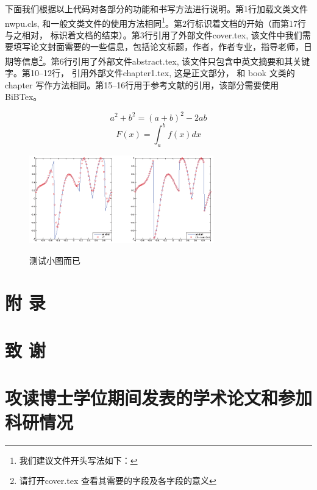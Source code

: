 \documentclass{nwpu}
\begin{document}
                \par
                \vskip 20pt
            下面我们根据以上代码对各部分的功能和书写方法进行说明。第1行加载文类文件nwpu.cls, 和一般文类文件的使用方法相同\footnote{我们建议文件开头写法如下：}。第2行标识着文档的开始（而第17行与之相对， 标识着文档的结束）。第3行引用了外部文件cover.tex, 该文件中我们需要填写论文封面需要的一些信息，包括论文标题，作者，作者专业，指导老师，日期等信息\footnote{请打开cover.tex 查看其需要的字段及各字段的意义}。第6行引用了外部文件abstract.tex, 该文件只包含中英文摘要和其关键字。第10--12行， 引用外部文件chapter1.tex, 这是正文部分， 和 book 文类的 chapter 写作方法相同。第15--16行用于参考文献的引用，该部分需要使用BiBTex\cite{LatexCompanion}。

            \begin{equation} 
                a^2 + b^2 = (a + b)^2 -2ab
            \end{equation}
            \begin{equation}
                F(x) = \int_a^b f(x) dx
            \end{equation}
            \begin{figure}
              \centering
              \includegraphics[width=8cm]{11.eps}\\
              \caption{测试小图而已}\label{figOne}
            \end{figure}




    \backmatter


    \chapter{附 \quad 录}

    \chapter{致 \quad 谢}

    \chapter{攻读博士学位期间发表的学术论文和参加科研情况}

    \statement  %
\end{document}
